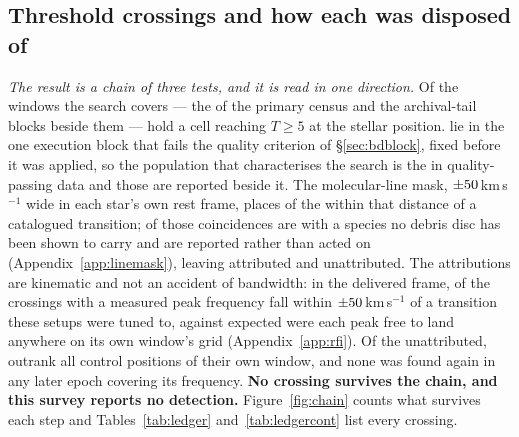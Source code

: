 \subsection{Threshold crossings and how each was disposed of}
\label{sec:technosearch}

\emph{The result is a chain of three tests, and it is read in one direction.}
Of the windows the search covers --- the \NWindows{} of the primary census
and the archival-tail blocks beside them --- \EvNCrossRaw{} hold a cell
reaching $T\geq5$ at the stellar position. \EvNCrossFlag{} lie in the one
execution block that fails the quality criterion of \S\ref{sec:bdblock}, fixed
before it was applied, so the population that characterises the search is the
\EvNCrossQp{} in quality-passing data and those \EvNCrossFlag{} are reported
beside it. The molecular-line mask, $\pm50$\,km\,s$^{-1}$ wide in
each star's own rest frame, places \MkNCoinc{} of the \EvNCrossQp{} within
that distance of a catalogued transition; \MkNSODecideWord{} of those
coincidences are with a species no debris disc has been shown to carry and are
reported rather than acted on (Appendix~\ref{app:linemask}), leaving
\EvNAttrQp{} attributed and \EvNUnattrQp{} unattributed. The attributions are
kinematic and not an accident of bandwidth: in the delivered frame,
\AppMTubeObs{} of the
\AppMNCrossF{} crossings with a measured peak frequency fall within
$\pm50$\,km\,s$^{-1}$ of a transition these setups were tuned to, against
\AppMTubeNull{} expected were each peak free to land anywhere on its own
window's grid (Appendix~\ref{app:rfi}). Of the unattributed,
\EvNRankQp{} outrank all \NCtrl{} control positions of their own window, and
none was found again in any later epoch covering its frequency. \textbf{No
crossing survives the chain, and this survey reports no detection.}
Figure~\ref{fig:chain} counts what survives each step and
Tables~\ref{tab:ledger} and~\ref{tab:ledgercont} list every crossing.

